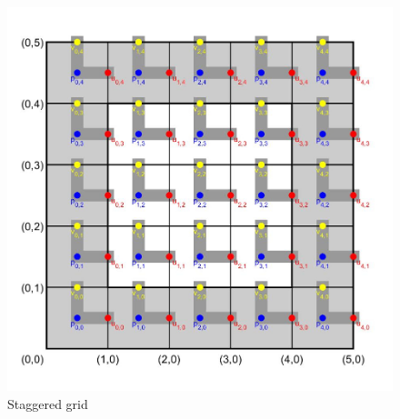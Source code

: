 \documentclass[12pt,pdftex,a4paper]{article}
\begin{document}
\begin{figure}[h!tb]
\centering
\includegraphics[width=1.0\textwidth]{pics/grid.jpg}
\caption{Staggered grid}
\label{fig:grid}
\end{figure}
\end{document}
